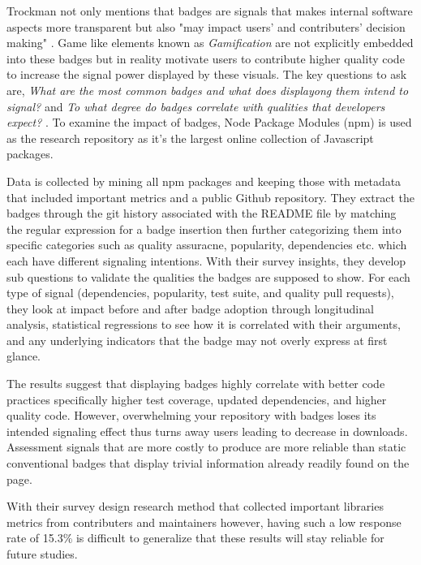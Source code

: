 \documentclass[12pt]{article}
\begin{document}
Trockman not only mentions that badges are signals that makes internal software aspects more transparent but also "may impact users' and contributers' decision making" \cite{githubbadges}.
Game like elements known as \textit{Gamification} are not explicitly embedded into these badges but in reality motivate users to contribute higher quality code to increase the signal power
displayed by these visuals. 
The key questions to ask are, \textit{What are the most common badges and what does displayong them intend to signal?} and 
\textit{To what degree do badges correlate with qualities that developers expect?} \cite{githubbadges}.
To examine the impact of badges, Node Package Modules (npm) \cite{npm} is used as the research repository as it's the largest online collection of Javascript packages. 

Data is collected by mining all npm \cite{npm} packages and keeping those with metadata that included 
important metrics and a public Github \cite{github} repository. They extract the badges through the git history associated with 
the README file by matching the regular expression for a badge insertion then further categorizing them into specific categories
such as quality assuracne, popularity, dependencies etc. which each have different signaling intentions.
With their survey insights, they develop sub questions to validate the qualities the badges are supposed to show. 
For each type of signal (dependencies, popularity, test suite, and quality pull requests), they look at 
impact before and after badge adoption through longitudinal analysis, statistical regressions
to see how it is correlated with their arguments, and any underlying indicators that the badge may not overly express at first glance.

The results suggest that displaying badges highly correlate with better code practices specifically higher test coverage, updated dependencies, and higher quality code.
However, overwhelming your repository with badges loses its intended signaling effect thus turns away users leading to decrease in downloads.
Assessment signals that are more costly to produce are more reliable than static conventional badges that display trivial information already readily found on the page.

With their survey design research method that collected important libraries metrics from contributers and maintainers however, having such a low response rate of 15.3\% 
is difficult to generalize that these results will stay reliable for future studies.
\end{document}
